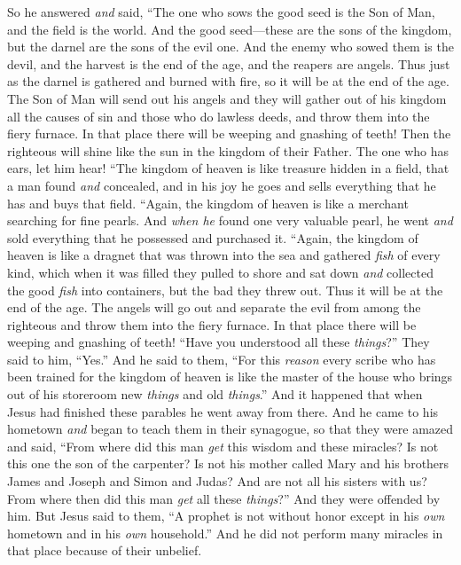 \begin{biblechapter}
\verse So he answered \textit{and} said, “The one who sows the good seed is the Son of Man,
\verse and the field is the world. And the good seed—these are the sons of the kingdom, but the darnel are the sons of the evil one.
\verse And the enemy who sowed them is the devil, and the harvest is the end of the age, and the reapers are angels.
\verse Thus just as the darnel is gathered and burned with fire, so it will be at the end of the age.
\verse The Son of Man will send out his angels and they will gather out of his kingdom all the causes of sin and those who do lawless deeds,
\verse and throw them into the fiery furnace. In that place there will be weeping and gnashing of teeth!
\verse Then the righteous will shine like the sun in the kingdom of their Father. The one who has ears, let him hear!
 “The kingdom of heaven is like treasure hidden in a field, that a man found \textit{and} concealed, and in his joy he goes and sells everything that he has and buys that field.
 “Again, the kingdom of heaven is like a merchant searching for fine pearls.
\verse And \textit{when he} found one very valuable pearl, he went \textit{and} sold everything that he possessed and purchased it.
 “Again, the kingdom of heaven is like a dragnet that was thrown into the sea and gathered \textit{fish} of every kind,
\verse which when it was filled they pulled to shore and sat down \textit{and} collected the good \textit{fish} into containers, but the bad they threw out.
\verse Thus it will be at the end of the age. The angels will go out and separate the evil from among the righteous
\verse and throw them into the fiery furnace. In that place there will be weeping and gnashing of teeth!
\verse “Have you understood all these \textit{things}?” They said to him, “Yes.”
\verse And he said to them, “For this \textit{reason} every scribe who has been trained for the kingdom of heaven is like the master of the house who brings out of his storeroom new \textit{things} and old \textit{things}.”
 And it happened that when Jesus had finished these parables he went away from there.
\verse And he came to his hometown \textit{and} began to teach them in their synagogue, so that they were amazed and said, “From where did this man \textit{get} this wisdom and these miracles?
\verse Is not this one the son of the carpenter? Is not his mother called Mary and his brothers James and Joseph and Simon and Judas?
\verse And are not all his sisters with us? From where then did this man \textit{get} all these \textit{things}?”
\verse And they were offended by him. But Jesus said to them, “A prophet is not without honor except in his \textit{own} hometown and in his \textit{own} household.”
\verse And he did not perform many miracles in that place because of their unbelief.
\end{biblechapter}

